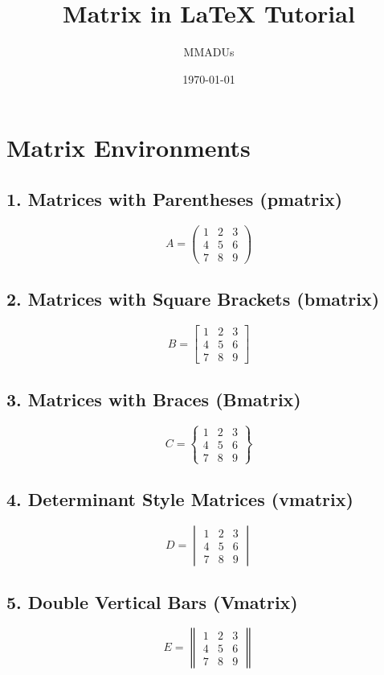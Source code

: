 \documentclass{article}
\title{Matrix in LaTeX Tutorial}
\author{MMADUs}
\date{\today}
\begin{document}
\maketitle

\section{Matrix Environments}

\subsection{1. Matrices with Parentheses (pmatrix)}
\[
A = \begin{pmatrix}
1 & 2 & 3 \\
4 & 5 & 6 \\
7 & 8 & 9
\end{pmatrix}
\]

\subsection{2. Matrices with Square Brackets (bmatrix)}
\[
B = \begin{bmatrix}
1 & 2 & 3 \\
4 & 5 & 6 \\
7 & 8 & 9
\end{bmatrix}
\]

\subsection{3. Matrices with Braces (Bmatrix)}
\[
C = \begin{Bmatrix}
1 & 2 & 3 \\
4 & 5 & 6 \\
7 & 8 & 9
\end{Bmatrix}
\]

\subsection{4. Determinant Style Matrices (vmatrix)}
\[
D = \begin{vmatrix}
1 & 2 & 3 \\
4 & 5 & 6 \\
7 & 8 & 9
\end{vmatrix}
\]

\subsection{5. Double Vertical Bars (Vmatrix)}
\[
E = \begin{Vmatrix}
1 & 2 & 3 \\
4 & 5 & 6 \\
7 & 8 & 9
\end{Vmatrix}
\]
\end{document}
